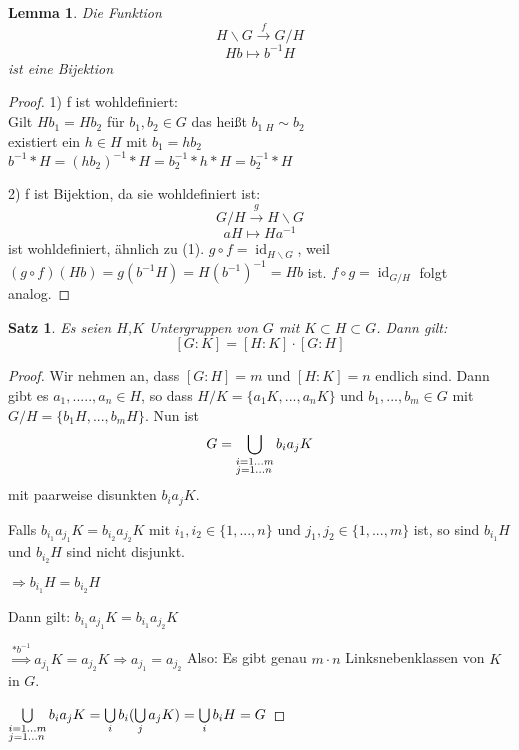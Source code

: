 \documentclass[12pt]{scrartcl}%
\newtheorem{thm}{Satz}
\newtheorem{lemma}{Lemma}
\theoremstyle{definition}
\theoremstyle{remark}
\DeclareMathOperator\id{id}
\begin{document}
\begin{lemma} 
Die Funktion
$$  	H\backslash G   \xrightarrow{f} G/H $$
$$	Hb \mapsto b^{-1}H$$
ist eine Bijektion

\end{lemma}

\begin{proof}
1) f ist wohldefiniert:\\
Gilt $Hb_{1}=Hb_{2}$ für $b_{1},b_{2} \in G$
das heißt $b_{1} {_{\ H}}\sim b_{2}$ \\
existiert ein $h \in H$ mit $b_1 = hb_2$ \\
$b^{-1}*H = (hb_2)^{-1}*H = b_{2}^{-1}*h*H =  b_{2}^{-1}*H$ 

2) f ist Bijektion, da sie wohldefiniert ist:
$$  	G/H   \xrightarrow{g} H\backslash G $$
$$	aH \mapsto Ha^{-1}$$
ist wohldefiniert, ähnlich zu (1).
$g \circ f = \id_{H \backslash G}$, weil $(g \circ f)(Hb) = g(b^{-1}H)=H(b^{-1})^{-1}=Hb$ ist.
$f \circ g = \id_{G \slash H}$ folgt analog.
\end{proof}

\begin{thm}
Es seien $H$,$K$ Untergruppen von $G$ mit $K \subset H \subset G$. Dann gilt: $$[G:K]=[H:K]\cdot[G:H]$$
\end{thm}

\begin{proof}
Wir nehmen an, dass $[G:H]=m$ und $[H:K]=n$ endlich sind. 
Dann gibt es $a_1,.....,a_n \in H$, so dass
$H/K=\{ a_1K,...,a_nK\}$ und $b_1,...,b_m \in G$ mit
$G/H=\{ b_1H,...,b_mH\}$. Nun ist $$G=\bigcup\limits_{\begin{subarray}{1}i=1...m \\ j=1...n\end{subarray}} b_ia_jK$$ mit paarweise disunkten $b_ia_jK$.

Falls $b_{i_{1}}a_{j_{1}}K=b_{i_{2}}a_{j_{2}}K$ mit $i_1,i_2 \in \{1,...,n \}$ und $j_1,j_2 \in \{1,...,m \}$ ist, so sind $b_{i_{1}}H$ und $b_{i_{2}}H$ sind nicht disjunkt.

$\Rightarrow b_{i_{1}}H=b_{i_{2}}H$

Dann gilt: $b_{i_{1}}a_{j_{1}}K=b_{i_{1}}a_{j_{2}}K$

$\overset{*b^{-1}}{\Rightarrow} a_{j_{1}}K=a_{j_{2}}K \Rightarrow a_{j_{1}}=a_{j_{2}}$
Also: Es gibt genau $m\cdot n$ Linksnebenklassen von $K$ in $G$.

$\bigcup\limits_{\begin{subarray}{1}i=1...m \\ j=1...n\end{subarray}} b_ia_jK =  \bigcup\limits_i b_i( \bigcup\limits_j a_jK)= \bigcup\limits_i b_iH=G$

\end{proof}
\end{document}
